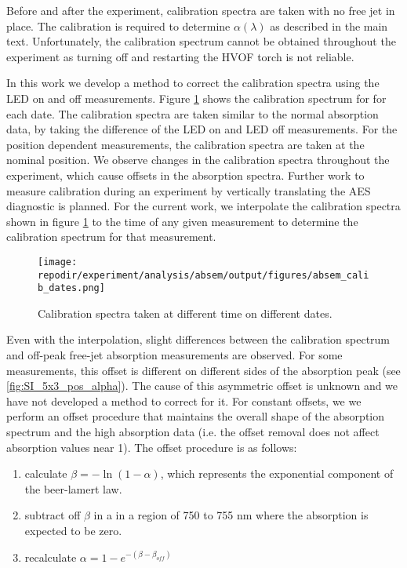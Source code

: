 Before and after the experiment, calibration spectra are taken with no free jet in place. The calibration is required to determine $\alpha(\lambda)$ as described in the main text. Unfortunately, the calibration spectrum cannot be obtained throughout the experiment as turning off and restarting the HVOF torch is not reliable.  

In this work we develop a method to correct the calibration spectra using the LED on and off measurements. Figure \ref{fig:SI_absem_calib_dates} shows the calibration spectrum for for each date. The calibration spectra are taken similar to the normal absorption data, by taking the difference of the LED on and LED off measurements. For the position dependent measurements, the calibration spectra are taken at the nominal position. We observe changes in the calibration spectra throughout the experiment, which cause offsets in the absorption spectra. Further work to measure calibration during an experiment by vertically translating the AES diagnostic is planned. For the current work, we interpolate the calibration spectra shown in figure \ref{fig:SI_absem_calib_dates} to the time of any given measurement to determine the calibration spectrum for that measurement. 

\begin{figure}[]
    \centering
    \texttt{[image: \\repodir/experiment/analysis/absem/output/figures/absem\_calib\_dates.png]}
    \caption{Calibration spectra taken at different time on different dates. }
    \label{fig:SI_absem_calib_dates}
\end{figure}

Even with the interpolation, slight differences between the calibration spectrum and off-peak free-jet absorption measurements are observed. For some measurements, this offset is different on different sides of the absorption peak (see \ref{fig:SI_5x3_pos_alpha}). The cause of this asymmetric offset is unknown and we have not developed a method to correct for it. For constant offsets, we we perform an offset procedure that maintains the overall shape of the absorption spectrum and the high absorption data (i.e. the offset removal does not affect absorption values near 1). The offset procedure is as follows:

\begin{enumerate}
    \item calculate $\beta = -\ln(1 - \alpha)$, which represents the exponential component of the beer-lamert law. 
    \item subtract off $\beta$ in a in a region of 750 to 755 nm where the absorption is expected to be zero.
    \item recalculate $\alpha = 1 - e^{- (\beta - \beta_{off})}$ 
\end{enumerate}

